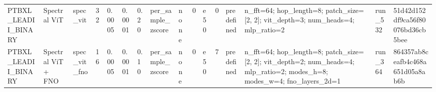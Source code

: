 \begin{longtable}{llllllllllllllll}
PTBXL\_LEADII\_BINARY & Spectral ViT & spec\_vit & 32 & 0.0005 & 0.0001 & 0.20 & per\_sample\_zscore & none & 0 & e50 & 0 & predefined & n\_fft=64; hop\_length=8; patch\_size=[2, 2]; vit\_depth=3; num\_heads=4; mlp\_ratio=2 & run\_532 & 51d42d152df9ca56f80076bd36cb5bee \\
PTBXL\_LEADII\_BINARY & Spectral ViT + FNO & spec\_vit\_fno & 16 & 0.0005 & 0.0001 & 0.10 & per\_sample\_zscore & none & 0 & e50 & 7 & predefined & n\_fft=64; hop\_length=8; patch\_size=[2, 2]; vit\_depth=2; num\_heads=4; mlp\_ratio=2; modes\_h=8; modes\_w=4; fno\_layers\_2d=1 & run\_364 & 864357ab8ceafb4c468a651d05a8ab6b \\
\end{longtable}
